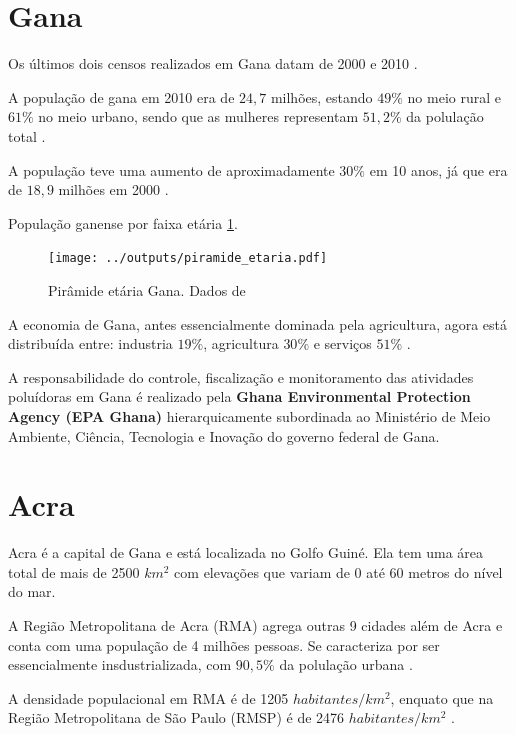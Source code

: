 \section{Gana}

Os últimos dois censos realizados em Gana datam
de 2000 \cite{censu2003} e 2010 \cite{censu2013}.

A população de gana em 2010 era de $24,7$ milhões, 
estando $49\%$ no meio rural e $61\%$ no meio urbano, 
sendo que as mulheres representam $51,2\%$ da polulação
total \cite{censu2013}.  

A população teve uma aumento de aproximadamente 
$30\%$ em 10 anos, já que era de $18,9$ milhões 
em 2000 \cite{censu2003}.

População ganense por faixa etária \ref{fig:piramedegana}. 

\begin{figure}[H]
\begin{center}
  \texttt{[image: ../outputs/piramide\_etaria.pdf]}
  \caption{Pirâmide etária Gana. Dados de \cite{censu2013} \label{fig:piramedegana}}
\end{center}
\end{figure}

A economia de Gana, antes essencialmente dominada pela agricultura, 
agora está distribuída entre: industria $19\%$, agricultura $30\%$ 
e serviços $51\%$ \cite{censu2013}. 

A responsabilidade do controle, fiscalização e monitoramento das 
atividades poluídoras em Gana é realizado pela 
\textbf{Ghana Environmental Protection Agency (EPA Ghana)} hierarquicamente
subordinada ao Ministério de Meio Ambiente, Ciência, Tecnologia e Inovação do 
governo federal de Gana.


\section{Acra}

Acra é a capital  de Gana e está localizada no Golfo Guiné. Ela tem uma área 
total de mais de 2500 $km^2$ com elevações que variam de 0 até 60 metros do nível 
do mar. 

A Região Metropolitana de Acra (RMA) agrega outras 9 cidades
além de Acra e conta com uma população de 4 milhões pessoas. 
Se caracteriza por ser essencialmente insdustrializada, com $90,5\%$ 
da polulação urbana \cite{censu2013}.

A densidade populacional em RMA é de 1205 $habitantes/km^2$, 
enquato que na Região Metropolitana de São Paulo (RMSP) é de 
2476 $habitantes/km^2$ \cite{ibge2011}. 

